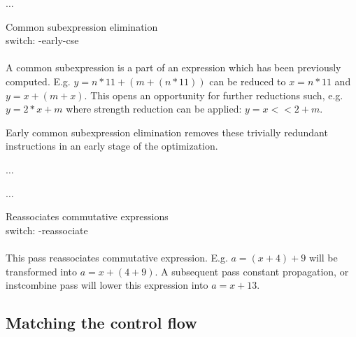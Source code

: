 \begin{description}
\begin{minipage}{.5\textwidth}
\begin{llvmcode}[mathescape, caption={After instcombine}]
$\dots$
\end{llvmcode}
\end{minipage}

\item Common subexpression elimination\\
switch: -early-cse\\\\
A common subexpression is a part of an expression which has been previously computed. E.g. $y = n*11 +( m + (n*11))$ can be reduced to $x = n * 11$ and $y = x + (m + x)$. This opens an opportunity for further reductions such, e.g. $y = 2 * x + m $ where strength reduction can be applied: $y = x << 2 + m$.

Early common subexpression elimination removes these trivially redundant instructions in an early stage of the optimization.

\begin{minipage}{.45\textwidth}
\begin{llvmcode}[mathescape, caption={Before early-cse}]
$\dots$
\end{llvmcode}
\end{minipage}\hfill %
\begin{minipage}{.5\textwidth}
\begin{llvmcode}[mathescape, caption={After early-cse}]


$\dots$
\end{llvmcode}
\end{minipage}

\item Reassociates commutative expressions\\
switch: -reassociate \\\\
This pass reassociates commutative expression. E.g. $a = (x + 4) + 9$ will be transformed into $a = x + (4 + 9)$. A subsequent pass constant propagation, or instcombine pass will lower this expression into $a = x + 13$.
\end{description}


\subsection{Matching the control flow}
\label{sec:control_flow_matching}

